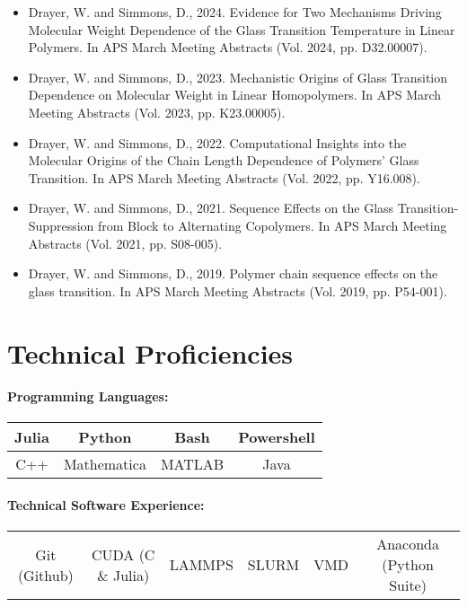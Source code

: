 \documentclass{my_cv}
\begin{document}
\begin{itemize}
    \item Drayer, W. and Simmons, D., 2024. Evidence for Two Mechanisms Driving Molecular Weight Dependence of the Glass Transition Temperature in Linear Polymers. In APS March Meeting Abstracts (Vol. 2024, pp. D32.00007).
    \item Drayer, W. and Simmons, D., 2023. Mechanistic Origins of Glass Transition Dependence on Molecular Weight in Linear Homo\-polymers. In APS March Meeting Abstracts (Vol. 2023, pp. K23.00005). 
    \item Drayer, W. and Simmons, D., 2022. Computational Insights into the Molecular Origins of the Chain Length Dependence of Polymers' Glass Transition. In APS March Meeting Abstracts (Vol. 2022, pp. Y16.008).
    \item Drayer, W. and Simmons, D., 2021. Sequence Effects on the Glass Transition-Suppression from Block to Alternating Co\-polymers. In APS March Meeting Abstracts (Vol. 2021, pp. S08-005).
    \item Drayer, W. and Simmons, D., 2019. Polymer chain sequence effects on the glass transition. In APS March Meeting Abstracts (Vol. 2019, pp. P54-001).
\end{itemize}

\section{Technical Proficiencies}

\paragraph{Programming Languages:}
\begin{center}
\begin{tabular}{c|c|c|c}
    Julia & Python & Bash & Powershell \\
    \hline
    C++ & Mathematica & MATLAB & Java \\
\end{tabular}
\end{center}

\paragraph{Technical Software Experience:}
\begin{center}
\begin{tabular}{c|c|c|c|c|c}
   Git (Github) & CUDA (C \& Julia) & LAMMPS & SLURM & VMD & Anaconda (Python Suite) \\
\end{tabular}
\end{center}
\end{document}

